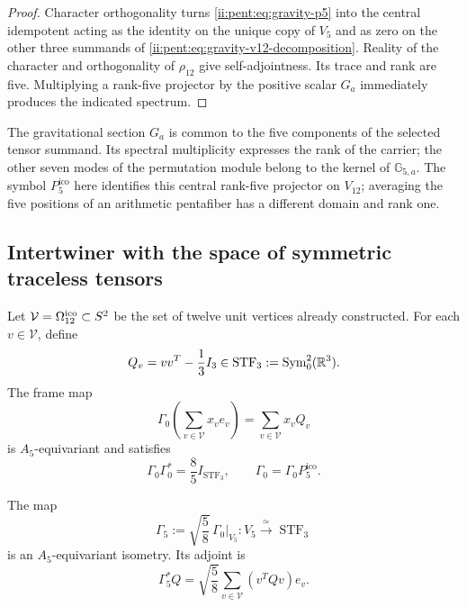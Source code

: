 \begin{proof}
Character orthogonality turns \eqref{ii:pent:eq:gravity-p5} into the
central idempotent acting as the identity on the unique copy of
\(V_5\) and as zero on the other three summands of
\eqref{ii:pent:eq:gravity-v12-decomposition}. Reality of the character and
orthogonality of \(\rho_{12}\) give self-adjointness. Its trace and rank
are five. Multiplying a rank-five projector by the positive scalar
\(G_a\) immediately produces the indicated spectrum.
\end{proof}

The gravitational section \(G_a\) is common to the five components of the
selected tensor summand. Its spectral multiplicity expresses the
rank of the carrier; the other seven modes of the permutation module
belong to the kernel of \(\mathbb G_{5,a}\). The symbol
\(P^{\mathrm{ico}}_5\) here identifies this central rank-five projector
on \(V_{12}\); averaging the five positions of an arithmetic
pentafiber has a different domain and rank one.

\subsection{Intertwiner with the space of symmetric traceless tensors}

Let \(\mathcal V=\Omega_{12}^{\rm ico}\subset S^2\) be the set of
twelve unit vertices already constructed. For each \(v\in\mathcal V\), define
\begin{equation}
\label{ii:pent:eq:gravity-Qv}
Q_v=vv^T-\frac13I_3\in
\operatorname{STF}_3:=\operatorname{Sym}^2_0(\mathbb R^3).
\end{equation}
The frame map
\begin{equation}
\label{ii:pent:eq:gravity-Gamma0}
\Gamma_0\!\left(\sum_{v\in\mathcal V}x_ve_v\right)
=\sum_{v\in\mathcal V}x_vQ_v
\end{equation}
is \(A_5\)-equivariant and satisfies
\begin{equation}
\label{ii:pent:eq:gravity-tight-frame}
\Gamma_0\Gamma_0^*=\frac85I_{\operatorname{STF}_3},
\qquad
\Gamma_0=\Gamma_0P^{\mathrm{ico}}_5.
\end{equation}

\begin{theorem}
\label{ii:pent:thm:gravity-gamma5}
The map
\begin{equation}
\label{ii:pent:eq:gravity-gamma5}
\boxed{
\Gamma_5:=\sqrt{\frac58}\,\Gamma_0|_{V_5}:
V_5\xrightarrow{\ \simeq\ }\operatorname{STF}_3}
\end{equation}
is an \(A_5\)-equivariant isometry. Its adjoint is
\begin{equation}
\label{ii:pent:eq:gravity-gamma5-adjoint}
\Gamma_5^*Q=\sqrt{\frac58}
\sum_{v\in\mathcal V}(v^TQv)e_v.
\end{equation}
\end{theorem}

